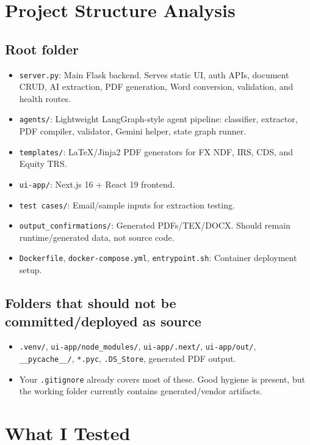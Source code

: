 \documentclass[11pt]{article}
\begin{document}
\section{Project Structure Analysis}

\subsection{Root folder}
\begin{itemize}
  \item \texttt{server.py}: Main Flask backend. Serves static UI, auth APIs, document CRUD, AI extraction, PDF generation, Word conversion, validation, and health routes.
  \item \texttt{agents/}: Lightweight LangGraph-style agent pipeline: classifier, extractor, PDF compiler, validator, Gemini helper, state graph runner.
  \item \texttt{templates/}: LaTeX/Jinja2 PDF generators for FX NDF, IRS, CDS, and Equity TRS.
  \item \texttt{ui-app/}: Next.js 16 + React 19 frontend.
  \item \texttt{test cases/}: Email/sample inputs for extraction testing.
  \item \texttt{output\_confirmations/}: Generated PDFs/TEX/DOCX. Should remain runtime/generated data, not source code.
  \item \texttt{Dockerfile}, \texttt{docker-compose.yml}, \texttt{entrypoint.sh}: Container deployment setup.
\end{itemize}

\subsection{Folders that should not be committed/deployed as source}
\begin{itemize}
  \item \texttt{.venv/}, \texttt{ui-app/node\_modules/}, \texttt{ui-app/.next/}, \texttt{ui-app/out/}, \texttt{\_\_pycache\_\_/}, \texttt{*.pyc}, \texttt{.DS\_Store}, generated PDF output.
  \item Your \texttt{.gitignore} already covers most of these. Good hygiene is present, but the working folder currently contains generated/vendor artifacts.
\end{itemize}

\section{What I Tested}
\end{document}
